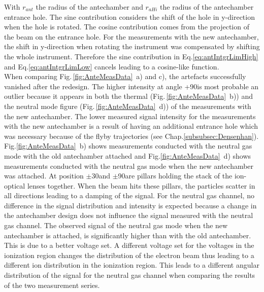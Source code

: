 	With $r_{ant}$ the radius of the antechamber and $r_{aHi}$ the radius of the antechamber entrance hole. The sine contribution considers the shift of the hole in y-direction when the hole is rotated. The cosine contribution comes from the projection of the beam on the entrance hole. For the measurements with the new antechamber, the shift in y-direction when rotating the instrument was compensated by shifting the whole instrument. Therefore the sine contribution in Eq.\eqref{eq:antIntgrLimHigh} and Eq.\eqref{eq:antIntgrLimLow} cancels leading to a cosine-like function.\\
	When comparing Fig.\,\ref{fig:AnteMeasData}~a) and c), the artefacts successfully vanished after the redesign. The higher intensity at angle +90\degree is most probable an outlier because it appears in both the thermal (Fig.\,\ref{fig:AnteMeasData}~b)) and the neutral mode figure (Fig.\,\ref{fig:AnteMeasData}~d)) of the measurements with the new antechamber. The lower measured signal intensity for the measurements with the new antechamber is a result of having an additional entrance hole which was necessary because of the flyby trajectories (see Chap.\ref{subsubsec:Densenhan}).\\
	Fig.\ref{fig:AnteMeasData}~b) shows measurements conducted with the neutral gas mode with the old antechamber attached and Fig.\ref{fig:AnteMeasData}~d) shows measurements conducted with the neutral gas mode when the new antechamber was attached. At position $\pm$30\degree and $\pm$90\degree are pillars holding the stack of the ion-optical lenses together. When the beam hits these pillars, the particles scatter in all directions leading to a damping of the signal. For the neutral gas channel, no difference in the signal distribution and intensity is expected because a change in the antechamber design does not influence the signal measured with the neutral gas channel. The observed signal of the neutral gas mode when the new antechamber is attached, is significantly higher than with the old antechamber. This is due to a better voltage set. A different voltage set for the voltages in the ionization region changes the distribution of the electron beam thus leading to a different ion distribution in the ionization region. This leads to a different angular distribution of the signal for the neutral gas channel when comparing the results of the two measurement series. 
	
